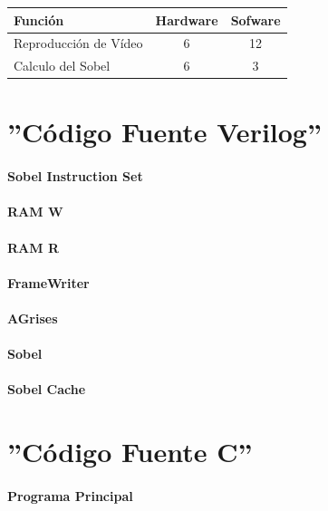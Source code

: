 \documentclass[a4paper,12pt,titlepage,final]{book}
\begin{document}
\begin{tabular}{l c c}
Función               & Hardware & Sofware \\
\hline
Reproducción de Vídeo & 6        & 12      \\
Calculo del Sobel     & 6        & 3       \\
\end{tabular}

\appendix
\pagestyle{empty}
\appendixpage
\noappendicestocpagenum
\addappheadtotoc

\chapter{''Código Fuente Verilog''}
\subsubsection{Sobel Instruction Set}

\subsubsection{RAM W}

\subsubsection{RAM R}

\subsubsection{FrameWriter}

\subsubsection{AGrises}

\subsubsection{Sobel}

\subsubsection{Sobel Cache}


\chapter{''Código Fuente C''}
\subsubsection{Programa Principal}
\lstset{
language=c
}


\backmatter



\end{document}
